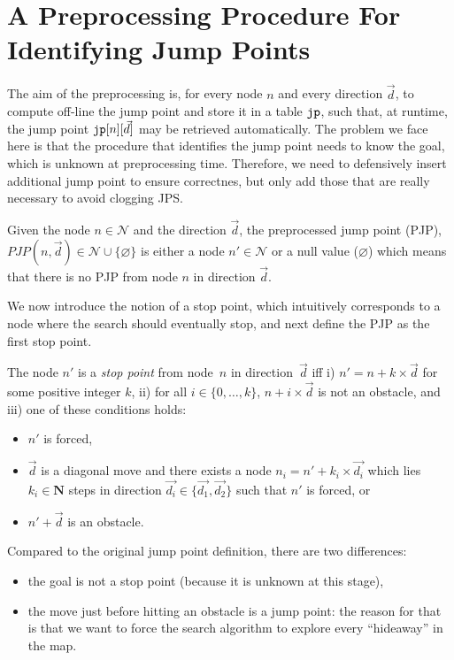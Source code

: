 \section{A Preprocessing Procedure For Identifying Jump Points}

The aim of the preprocessing 
is, for every node $n$ and every direction $\vec{d}$, 
to compute off-line the jump point 
and store it in a table $\texttt{jp}$, 
such that, at runtime, the jump point $\texttt{jp}[n][\vec{d}]$
may be retrieved automatically.  
The problem we face here 
is that the procedure that identifies the jump point 
needs to know the goal, 
which is unknown at preprocessing time.  
Therefore, we need 
to defensively insert additional jump point 
to ensure correctnes, 
but only add those that are really necessary 
to avoid clogging JPS.  

Given the node $n \in \mathcal{N}$ and the direction $\vec{d}$, 
the preprocessed jump point (PJP), 
$PJP(n,\vec{d}) \in \mathcal{N} \cup \{\varnothing\}$ 
is either a node $n' \in \mathcal{N}$ 
or a null value ($\varnothing$) which means that there is no PJP 
from node $n$ in direction $\vec{d}$.  

We now introduce the notion of a stop point, 
which intuitively corresponds to a node 
where the search should eventually stop, 
and next define the PJP as the first stop point.  

\begin{definition}\label{def::stop}
  The node $n'$ is a \emph{stop point} 
  from node~$n$ in direction~$\vec{d}$ 
  iff i) $n' = n + k \times \vec{d}$ for some positive integer $k$, 
  ii) for all $i \in \{0,\dots,k\}$, 
  $n + i \times \vec{d}$ is not an obstacle, 
  and iii) one of these conditions holds: 
  \begin{itemize}
  \item 
    $n'$ is forced, 
  \item 
    $\vec{d}$ is a diagonal move 
    and there exists a node $n_i = n' + k_i \times \vec{d_i}$ 
    which lies $k_i \in \mathbf{N}$ steps 
    in direction $\vec{d_i} \in \{\vec{d_1},\vec{d_2}\}$ 
    such that $n'$ is forced, 
    or
  \item
    $n' + \vec{d}$ is an obstacle.  
  \end{itemize}
\end{definition}

Compared to the original jump point definition, 
there are two differences: 
\begin{itemize}
\item 
  the goal is not a stop point (because it is unknown at this stage), 
\item 
  the move just before hitting an obstacle is a jump point: 
  the reason for that is that we want 
  to force the search algorithm to explore every ``hideaway'' in the map.  
\end{itemize}

